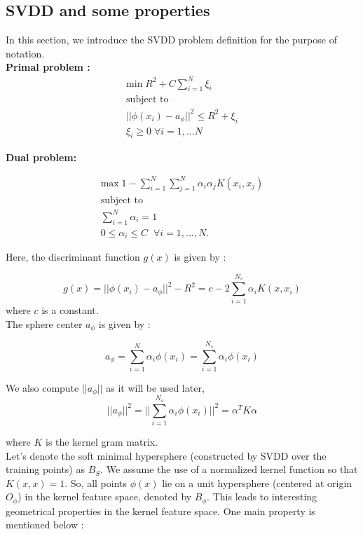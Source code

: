 \documentclass{article} %
\begin{document}
\subsection{SVDD and some properties}
In this section, we introduce the SVDD problem definition for the purpose of notation. \\[10pt]

\textbf{Primal problem :}
\begin{equation}
\begin{split}
\text{min} \; R^2 + C \sum\limits_{i=1}^N \xi_i \\
\text{subject to}\\
||\phi(x_i) - a_{\phi}||^2  \leq R^2 + \xi_i \\
\xi_i \geq 0 \; \forall i = 1,...N
\end{split}
\end{equation}

\textbf{Dual problem:}

\begin{equation}
\begin{split}
\text{max}\; 1 - \sum\limits_{i=1}^N \sum\limits_{j=1}^N \alpha_i \alpha_j K(x_i,x_j) \\
\text{subject to}  \\
\sum\limits_{i = 1}^N \alpha_i  = 1  \\
0 \leq \alpha_i \leq C \;\; \forall  i = 1,...,N.  
\end{split}
\end{equation}


Here, the discriminant function $g(x)$ is given by :

\[ g(x) = ||\phi(x_i) - a_{\phi}||^2 - R^2 = c - 2 \sum\limits_{i=1}^{N_s}\alpha_i K(x,x_i) \]
where $c$ is a constant. \\[10pt]

The sphere center $a_\phi$ is given by :

\[ a_\phi  = \sum\limits_{i=1}^{N} \alpha_i \phi(x_i) = \sum\limits_{i=1}^{N_s} \alpha_i \phi(x_i)\]

We also compute $||a_\phi||$ as it will be used later, 
\begin{equation} \label{norm}
||a_\phi||^2 = ||\sum\limits_{i=1}^{N_s} \alpha_i \phi(x_i) ||^2  = \alpha^T K \alpha
\end{equation}

where $K$ is the kernel gram matrix. \\[10pt]


Let's denote the soft minimal hypersphere (constructed by SVDD over the training points) as $B_S$. We assume the use of a normalized kernel function so that $K(x,x) = 1$. So, all points $\phi(x)$ lie on a unit hypersphere (centered at origin $O_\phi$) in the kernel feature space, denoted by $B_\phi$. This leads to interesting geometrical properties in the kernel feature space. One main property is mentioned below : \\[10pt]
\end{document}
